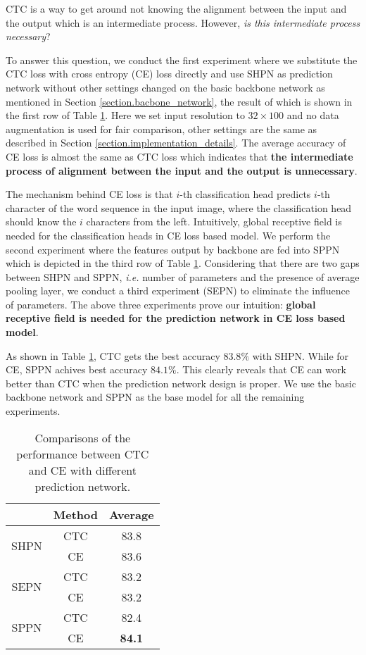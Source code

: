 \documentclass[final]{cvpr}
\begin{document}
CTC is a way to get around not knowing the alignment between the input and the output which is an intermediate process. However, \textit{is this intermediate process necessary}?

To answer this question, we conduct the first experiment where we substitute the CTC loss with cross entropy (CE) loss directly and use SHPN as prediction network without other settings changed on the basic backbone network \cite{cheng2017focusing} as mentioned in Section \ref{section.bacbone_network}, the result of which is shown in the first row of Table \ref{table.CTC_vs_CE}. Here we set input resolution to $32\times100$ and no data augmentation is used for fair comparison, other settings are the same as described in Section \ref{section.implementation_details}. The average accuracy of CE loss is almost the same as CTC loss which indicates that \textbf{the intermediate process of alignment between the input and the output is unnecessary}.

The mechanism behind CE loss is that $i$-th classification head predicts $i$-th character of the word sequence in the input image, where the classification head should know the $i$ characters from the left. Intuitively, global receptive field is needed for the classification heads in CE loss based model. We perform the second experiment where the features output by backbone are fed into SPPN which is depicted in the third row of Table \ref{table.CTC_vs_CE}. Considering that there are two gaps between SHPN and SPPN, \textit{i.e.} number of parameters and the presence of average pooling layer, we conduct a third experiment (SEPN) to eliminate the influence of parameters. The above three experiments prove our intuition: \textbf{global receptive field is needed for the prediction network in CE loss based model}.

As shown in Table \ref{table.CTC_vs_CE}, CTC gets the best accuracy $83.8\%$ with SHPN. While for CE, SPPN achives best accuracy $84.1\%$. This clearly reveals that CE can work better than CTC when the prediction network design is proper. 
We use the basic backbone network and SPPN as the base model for all the remaining experiments.


\begin{table}[htb]
	\centering
    \caption{Comparisons of the performance between CTC and CE with different prediction network.}
    \label{table.CTC_vs_CE}
    	\begin{tabular}{ | c | c | c |}
    		\hline
    		 	& Method & Average \\ 
    		\hline
    		\multirow{2}{*}{SHPN}
    		    & CTC & 83.8 \\ 
    		    & CE & 83.6 \\ 
    		\hline
    		\multirow{2}{*}{SEPN}
    		    & CTC & 83.2 \\ 
    		    & CE & 83.2 \\ 
    		\hline 
    		\multirow{2}{*}{SPPN}
    		    & CTC & 82.4 \\ 
    		    & CE & \textbf{84.1} \\ 
    		\hline
    	\end{tabular}
	
\end{table}
\end{document}
